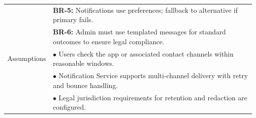 \begin{longtable}{|>{\raggedright\arraybackslash}p{4cm}|>{\raggedright\arraybackslash}p{11cm}|}
& \textbf{BR-5:} Notifications use preferences; fallback to alternative if primary fails. \\
& \textbf{BR-6:} Admin must use templated messages for standard outcomes to ensure legal compliance. \\
\hline
Assumptions & $\bullet$ Users check the app or associated contact channels within reasonable windows. \\
& $\bullet$ Notification Service supports multi-channel delivery with retry and bounce handling. \\
& $\bullet$ Legal jurisdiction requirements for retention and redaction are configured. \\
\hline
\end{longtable}

